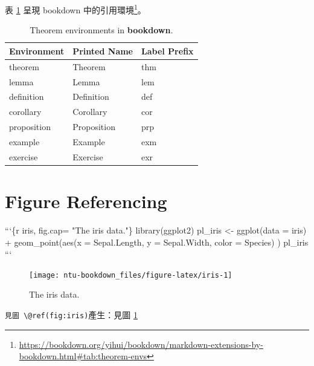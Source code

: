 \documentclass[oneside]{book}
\newenvironment{Shaded}{\begin{snugshade}}{\end{snugshade}}
\newcommand{\BaseNTok}[1]{\textcolor[rgb]{0.00,0.00,0.81}{#1}}
\newcommand{\NormalTok}[1]{#1}
\renewcommand{\href}[2]{#2\footnote{\url{#1}}}
\theoremstyle{definition}
\theoremstyle{definition}
\theoremstyle{definition}
\theoremstyle{remark}
\begin{document}
表 \ref{tab:theorem-envs} 呈現 bookdown
中的\href{https://bookdown.org/yihui/bookdown/markdown-extensions-by-bookdown.html\#tab:theorem-envs}{引用環境}。



\begin{table}[t]

\caption{\label{tab:theorem-envs}Theorem environments in \textbf{bookdown}.}
\centering
\begin{tabular}{lll}
\toprule
Environment & Printed Name & Label Prefix\\
\midrule
theorem & Theorem & thm\\
lemma & Lemma & lem\\
definition & Definition & def\\
corollary & Corollary & cor\\
proposition & Proposition & prp\\
\addlinespace
example & Example & exm\\
exercise & Exercise & exr\\
\bottomrule
\end{tabular}
\end{table}

\section{Figure Referencing}\label{figure-referencing}

\begin{Shaded}
\begin{Highlighting}[]
\NormalTok{```\{r iris, fig.cap= "The iris data."\}}
\NormalTok{library(ggplot2)}
\NormalTok{pl_iris <- ggplot(data = iris) +}
\BaseNTok{             geom_point(aes(x = Sepal.Length,}
\BaseNTok{                            y = Sepal.Width,}
\BaseNTok{                            color = Species)}
\BaseNTok{                        )}
\NormalTok{pl_iris}
\NormalTok{```}
\end{Highlighting}
\end{Shaded}

\begin{figure}[H]

{\centering \texttt{[image: ntu-bookdown\_files/figure-latex/iris-1]} 

}

\caption{The iris data.}\label{fig:iris}
\end{figure}

\texttt{見圖\ \textbackslash{}@ref(fig:iris)}產生：見圖 \ref{fig:iris}
\end{document}
